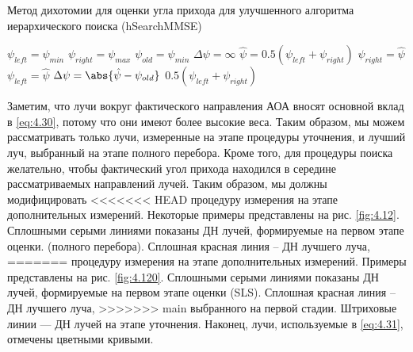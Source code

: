 \begin{algorithm}
    \caption{Метод дихотомии для оценки угла прихода для улучшенного алгоритма иерархического поиска (hSearchMMSE)}
    \label{lst:4.1}
    \begin{algorithmic}
        \State $\psi_{left} = \psi_{min}$
        \State $\psi_{right} = \psi_{max}$
        \State $\psi_{old} = \psi_{min}$
        \State $\Delta \psi = \infty$
        \While{$\Delta \psi > \epsilon$}
        \State $\hat \psi = 0.5 (\psi_{left} + \psi_{right})$
        \State $\psi_{right} = \hat\psi$
        \Else
        \State $\psi_{left} = \hat\psi$
        \EndIf
        \State $\Delta \psi = \abs{\hat \psi - \psi_{old}}$
        \EndWhile
        \State \Return $0.5(\psi_{left} + \psi_{right})$
    \end{algorithmic}
\end{algorithm}

Заметим, что лучи вокруг фактического направления АОА вносят основной вклад в
\eqref{eq:4.30}, потому что они имеют более высокие веса. Таким образом, мы
можем рассматривать только лучи, измеренные на этапе процедуры уточнения, и
лучший луч, выбранный на этапе полного перебора. Кроме того, для
процедуры поиска желательно, чтобы фактический угол прихода находился в середине
рассматриваемых направлений лучей. Таким образом, мы должны модифицировать
<<<<<<< HEAD
процедуру измерения на этапе дополнительных измерений. Некоторые примеры
представлены на рис.  \ref{fig:4.12}.
Сплошными серыми линиями показаны ДН лучей, формируемые на первом этапе оценки.
(полного перебора). Сплошная красная линия -- ДН лучшего луча,
=======
процедуру измерения на этапе дополнительных измерений. Примеры
представлены на рис.  \ref{fig:4.120}.
Сплошными серыми линиями показаны ДН лучей, формируемые на первом этапе оценки
(SLS). Сплошная красная линия -- ДН лучшего луча,
>>>>>>> main
выбранного на первой стадии. Штриховые линии — ДН лучей на этапе
уточнения. Наконец, лучи, используемые в \eqref{eq:4.31}, отмечены цветными кривыми.

